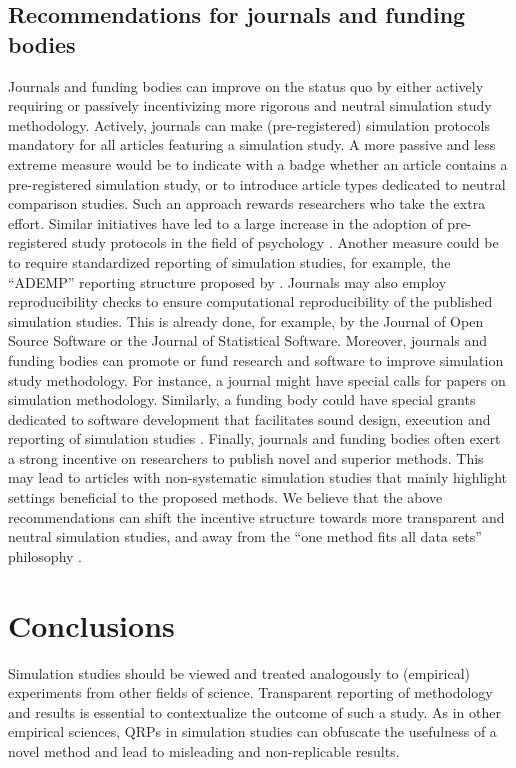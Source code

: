 \subsection{Recommendations for journals and funding bodies}
Journals and funding bodies can improve on the status quo by either actively
requiring or passively incentivizing more rigorous and neutral simulation study
methodology. Actively, journals can make (pre-registered) simulation protocols
mandatory for all articles featuring a simulation study. A more passive and less
extreme measure would be to indicate with a badge whether an article contains a
pre-registered simulation study, or to introduce article types dedicated to
neutral comparison studies. Such an approach rewards researchers who take the
extra effort. Similar initiatives have led to a large increase in the adoption
of pre-registered study protocols in the field of psychology
\citep{Kidwell2016}. Another measure could be to require standardized reporting
of simulation studies, for example, the ``ADEMP'' reporting structure proposed
by \citet{Morris2019}. Journals may also employ reproducibility checks to ensure
computational reproducibility of the published simulation studies. This is
already done, for example, by the Journal of Open Source Software or the Journal
of Statistical Software. Moreover, journals and funding bodies can promote or
fund research and software to improve simulation study methodology. For
instance, a journal might have special calls for papers on simulation
methodology. Similarly, a funding body could have special grants dedicated to
software development that facilitates sound design, execution and reporting of
simulation studies \citep[as][]{White2010, Gasparini2018, Chalmers2020}.
Finally, journals and funding bodies often exert a strong incentive on
researchers to publish novel and superior methods. This may lead to articles
with non-systematic simulation studies that mainly highlight settings beneficial
to the proposed methods. We believe that the above recommendations can shift the
incentive structure towards more transparent and neutral simulation studies, and
away from the ``one method fits all data sets'' philosophy \citep{Strobl2022}.

\section{Conclusions} \label{sec6:discussion}

Simulation studies should be viewed and treated analogously to (empirical)
experiments from other fields of science. Transparent reporting of methodology
and results is essential to contextualize the outcome of such a study. As in
other empirical sciences, QRPs in simulation studies can obfuscate the
usefulness of a novel method and lead to misleading and non-replicable results.


